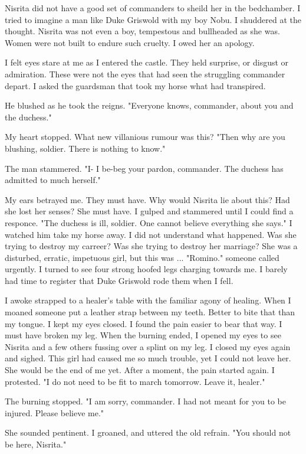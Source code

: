 \documentclass{article}
\begin{document}
Nisrita did not have a good set of commanders to sheild her in the bedchamber. I tried to imagine a man like Duke Griswold with my boy Nobu. I shuddered at the thought. Nisrita was not even a boy, tempestous and bullheaded as she was. Women were not built to endure such cruelty. I owed her an apology.

I felt eyes stare at me as I entered the castle. They held surprise, or disgust or admiration. These were not the eyes that had seen the struggling commander depart. I asked the guardsman that took my horse what had transpired. 

He blushed as he took the reigns. "Everyone knows, commander, about you and the duchess."

My heart stopped. What new villanious rumour was this? "Then why are you blushing, soldier. There is nothing to know."

The man stammered. "I- I  be-beg your pardon, commander. The duchess has admitted to much herself."

My ears betrayed me. They must have. Why would Nisrita lie about this? Had she lost her senses? She must have. I gulped and stammered until I could find a responce. "The duchess is ill, soldier. One cannot believe everything she says." I watched him take my horse away. I did not understand what happened. Was she trying to destroy my carreer? Was she trying to destroy her marriage? She was a disturbed, erratic, impetuous girl, but this was ... "Romino." someone called urgently. I turned to see four strong hoofed legs charging towards me. I barely had time to register that Duke Griswold rode them when I fell. 

I awoke strapped to a healer's table with the familiar agony of healing. When I moaned someone put a leather strap between my teeth. Better to bite that than my tongue. I kept my eyes closed. I found the pain easier to bear that way. I must have broken my leg. When the burning ended, I opened my eyes to see Nisrita and a few others fussing over a splint on my leg. I closed my eyes again and sighed. This girl had caused me so much trouble, yet I could not leave her. She would be the end of me yet. After a moment, the pain started again. I protested. "I do not need to be fit to march tomorrow. Leave it, healer."

The burning stopped. "I am sorry, commander. I had not meant for you to be injured. Please believe me."

She sounded pentinent. I groaned, and uttered the old refrain. "You should not be here, Nisrita."
\end{document}
